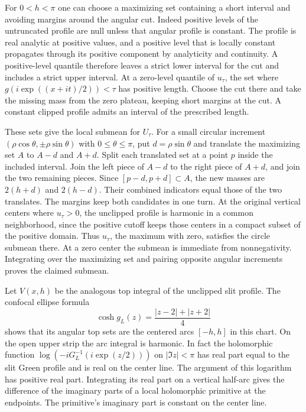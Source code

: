 \documentclass[11pt]{article}
\begin{document}
	For $0<h<\pi$ one can choose a maximizing set containing a short
	interval and avoiding margins around the angular cut. Indeed positive
	levels of the untruncated profile are null unless that angular
	profile is constant. The profile is real analytic at positive
	values, and a positive level that is locally constant propagates
	through its positive component by analyticity and continuity. A
	positive-level quantile therefore leaves a strict lower interval
	for the cut and includes a strict upper interval. At a zero-level
	quantile of $u_\tau$, the set where $g(i\exp((x+it)/2))<\tau$ has
	positive length. Choose the cut there and take the missing mass from
	the zero plateau, keeping short margins at the cut. A constant
	clipped profile admits an interval of the prescribed length.
	
	These sets give the local submean for $U_\tau$. For a small circular
	increment $(\rho\cos\theta,\pm\rho\sin\theta)$ with
	$0\le\theta\le\pi$, put $d=\rho\sin\theta$ and translate the
	maximizing set $A$ to $A-d$ and $A+d$. Split each translated set at a
	point $p$ inside the included interval. Join the left piece of $A-d$
	to the right piece of $A+d$, and join the two remaining pieces.
	Since $[p-d,p+d]\subset A$, the new masses are $2(h+d)$ and $2(h-d)$.
	Their combined indicators equal those of the two translates. The
	margins keep both candidates in one turn. At the original vertical
	centers where $u_\tau>0$, the
	unclipped profile is harmonic in a common neighborhood, since the
	positive cutoff keeps those centers in a compact subset of the
	positive domain. Thus $u_\tau$, the maximum with zero, satisfies the
	circle submean there. At a zero center the submean is immediate from
	nonnegativity. Integrating over the maximizing set and pairing
	opposite angular increments proves the claimed submean.
	
	Let $V(x,h)$ be the analogous top integral of the unclipped slit
	profile. The confocal ellipse formula
	\[
	\cosh g_L(z)=\frac{|z-2|+|z+2|}{4}
	\]
	shows that its angular top sets are the centered arcs $[-h,h]$ in
	this chart. On the open upper strip the arc integral is harmonic.
	In fact the holomorphic function
	$\log(-iG_L^{-1}(i\exp(z/2)))$ on $|\Im z|<\pi$ has real part
	equal to the slit Green profile and is real on the center line.
	The argument of this logarithm has positive real part. Integrating
	its real part on a vertical half-arc gives the difference of the
	imaginary parts of a local holomorphic primitive at the endpoints.
	The primitive's imaginary part is constant on the center line.
	
\end{document}

